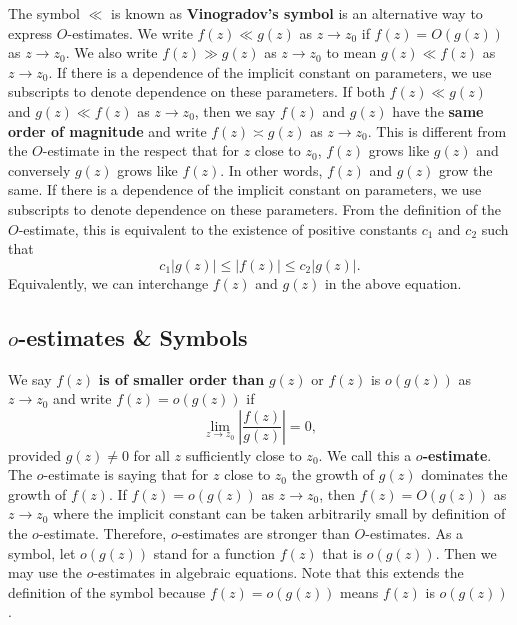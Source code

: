         The symbol $\ll$ is known as \textbf{Vinogradov's symbol} is an alternative way to express $O$-estimates. We write $f(z) \ll g(z)$ as $z \to z_{0}$ if $f(z) = O(g(z))$ as $z \to z_{0}$. We also write $f(z) \gg g(z)$ as $z \to z_{0}$ to mean $g(z) \ll f(z)$ as $z \to z_{0}$. If there is a dependence of the implicit constant on parameters, we use subscripts to denote dependence on these parameters. If both $f(z) \ll g(z)$ and $g(z) \ll f(z)$ as $z \to z_{0}$, then we say $f(z)$ and $g(z)$ have the \textbf{same order of magnitude} and write $f(z) \asymp g(z)$ as $z \to z_{0}$. This is different from the $O$-estimate in the respect that for $z$ close to $z_{0}$, $f(z)$ grows like $g(z)$ and conversely $g(z)$ grows like $f(z)$. In other words, $f(z)$ and $g(z)$ grow the same. If there is a dependence of the implicit constant on parameters, we use subscripts to denote dependence on these parameters. From the definition of the $O$-estimate, this is equivalent to the existence of positive constants $c_{1}$ and $c_{2}$ such that
        \[
          c_{1}|g(z)| \le |f(z)| \le c_{2}|g(z)|.
        \]
        Equivalently, we can interchange $f(z)$ and $g(z)$ in the above equation.
      \subsection*{\texorpdfstring{$o$}{o}-estimates \& Symbols}
        We say $f(z)$ \textbf{is of smaller order than} $g(z)$ or $f(z)$ is $o(g(z))$ as $z \to z_{0}$ and write $f(z) = o(g(z))$ if
        \[
          \lim_{z \to z_{0}}\left|\frac{f(z)}{g(z)}\right| = 0,
        \]
        provided $g(z) \neq 0$ for all $z$ sufficiently close to $z_{0}$. We call this a \textbf{$o$-estimate}. The $o$-estimate is saying that for $z$ close to $z_{0}$ the growth of $g(z)$ dominates the growth of $f(z)$. If $f(z) = o(g(z))$ as $z \to z_{0}$, then $f(z) = O(g(z))$ as $z \to z_{0}$ where the implicit constant can be taken arbitrarily small by definition of the $o$-estimate. Therefore, $o$-estimates are stronger than $O$-estimates. As a symbol, let $o(g(z))$ stand for a function $f(z)$ that is $o(g(z))$. Then we may use the $o$-estimates in algebraic equations. Note that this extends the definition of the symbol because $f(z) = o(g(z))$ means $f(z)$ is $o(g(z))$.

